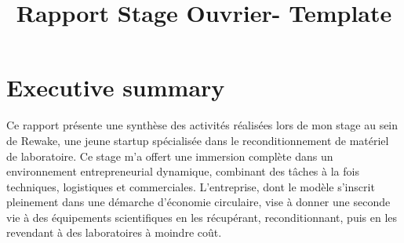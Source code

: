 \documentclass{rapportENSCP}
\title{Rapport Stage Ouvrier- Template} %
\begin{document}








        
\fairemarges %
\fairepagedegarde %



\tabledematieres %




\section{Executive summary} 
Ce rapport présente une synthèse des activités réalisées lors de mon stage au sein de Rewake, une jeune startup spécialisée dans le reconditionnement de matériel de laboratoire. Ce stage m’a offert une immersion complète dans un environnement entrepreneurial dynamique, combinant des tâches à la fois techniques, logistiques et commerciales. L’entreprise, dont le modèle s’inscrit pleinement dans une démarche d’économie circulaire, vise à donner une seconde vie à des équipements scientifiques en les récupérant, reconditionnant, puis en les revendant à des laboratoires à moindre coût.
\end{document}
